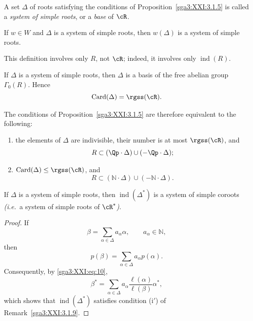 \begin{definition}\label{sga3:XXI:3.1.6}
A set \(\Delta\) of roots satisfying the conditions of
Proposition~\ref{sga3:XXI:3.1.5} is called a
\emph{system of simple roots}, or a \emph{base} of \(\cR\).
\end{definition}

If \(w\in W\) and \(\Delta\) is a system of simple roots, then
\(w(\Delta)\) is a system of simple roots.

\begin{remark}\label{sga3:XXI:3.1.7}
This definition involves only \(R\), not \(\cR\); indeed, it involves
only \(\operatorname{ind}(R)\).
\end{remark}

\begin{remark}\label{sga3:XXI:3.1.8}
If \(\Delta\) is a system of simple roots, then \(\Delta\) is a basis
of the free abelian group \(\Gamma_0(R)\). Hence
\[
 \operatorname{Card}(\Delta)=\rgss(\cR).
\]
\end{remark}

\begin{remark}\label{sga3:XXI:3.1.9}
The conditions of Proposition~\ref{sga3:XXI:3.1.5} are therefore
equivalent to the following:
\begin{enumerate}
\item[(i\('\))] the elements of \(\Delta\) are indivisible, their
  number is at most \(\rgss(\cR)\), and
  \[
   R\subset(\Qp\cdot\Delta)\cup(-\Qp\cdot\Delta);
  \]
\item[(ii\('\))] \(\operatorname{Card}(\Delta)\leq\rgss(\cR)\), and
  \[
   R\subset(\mathbb N\cdot\Delta)\cup(-\mathbb N\cdot\Delta).
  \]
\end{enumerate}
\end{remark}


\begin{corollary}\label{sga3:XXI:3.1.10}
If \(\Delta\) is a system of simple roots, then
\(\operatorname{ind}(\Delta^\ast)\) is a system of simple coroots
\emph{(i.e.}\ a system of simple roots of \(\cR^\ast\)\emph{)}.
\end{corollary}

\begin{proof}
If
\[
 \beta=\sum_{\alpha\in\Delta}a_\alpha\alpha,
 \qquad a_\alpha\in\mathbb N,
\]
then
\[
 p(\beta)=\sum_{\alpha\in\Delta}a_\alpha p(\alpha).
\]
Consequently, by \eqref{sga3:XXI:eq:10},
\[
 \beta^\ast
 =\sum_{\alpha\in\Delta}
   a_\alpha\frac{\ell(\alpha)}{\ell(\beta)}\alpha^\ast,
\]
which shows that \(\operatorname{ind}(\Delta^\ast)\) satisfies
condition (i\('\)) of Remark~\ref{sga3:XXI:3.1.9}.
\end{proof}


